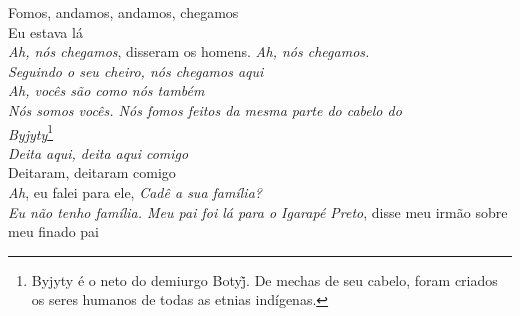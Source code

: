 \begin{linenumbers}\begingroup\raggedright
 
\noindent Fomos, andamos, andamos, chegamos\\
  Eu estava lá\\
  \emph{Ah, nós chegamos}, disseram os homens. \emph{Ah, nós chegamos.\\
 Seguindo o seu cheiro, nós chegamos aqui}\\
  \emph{Ah, vocês são como nós também}\\
  \emph{Nós somos vocês. Nós fomos feitos da mesma parte do cabelo do\\
 Byjyty}\footnote{Byjyty é o neto do demiurgo Botyj̃. De mechas de seu cabelo, foram criados os seres humanos de todas as etnias indígenas.}\\
  \emph{Deita aqui, deita aqui comigo}\\
  Deitaram, deitaram comigo\\
  \emph{Ah}, eu falei para ele, \emph{Cadê a sua família?}\\
  \emph{Eu não tenho família. Meu pai foi lá para o Igarapé Preto}, disse
 meu irmão sobre meu finado pai
 
\end{linenumbers}\endgroup

\bigskip

